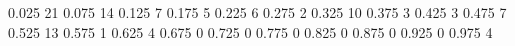 0.025 21
0.075 14
0.125 7
0.175 5
0.225 6
0.275 2
0.325 10
0.375 3
0.425 3
0.475 7
0.525 13
0.575 1
0.625 4
0.675 0
0.725 0
0.775 0
0.825 0
0.875 0
0.925 0
0.975 4

